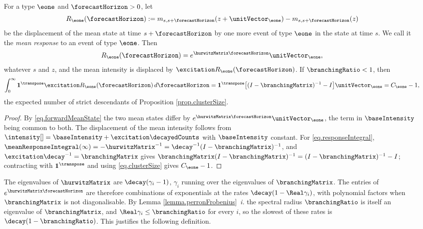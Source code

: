 \begin{corol}\label{corol.meanResponse}
 For a type $\eone$ and $\forecastHorizon > 0$, let
 \begin{equation*}
  R_{\eone}(\forecastHorizon)
  := m_{s,s+\forecastHorizon}(z + \unitVector_{\eone})
  - m_{s,s+\forecastHorizon}(z)
 \end{equation*}
 be the displacement of the mean state at time $s + \forecastHorizon$
 by one more event of type $\eone$ in the state at time $s$.
 We call it the \emph{mean response} to an event of type $\eone$.
 Then
 \begin{equation}\label{eq.meanResponse}
  R_{\eone}(\forecastHorizon) = e^{\hurwitzMatrix \forecastHorizon}\unitVector_{\eone} ,
 \end{equation}
 whatever $s$ and $z$,
 and the mean intensity is displaced by $\excitation R_{\eone}(\forecastHorizon)$.
 If $\branchingRatio < 1$, then
 \begin{equation}\label{eq.responseIntegral}
  \int_{0}^{\infty} \mathbf{1}^{\transpose}\excitation R_{\eone}(\forecastHorizon)
  \, d\forecastHorizon
  = \mathbf{1}^{\transpose}\big[ (I - \branchingMatrix)^{-1} - I \big] \unitVector_{\eone}
  = C_{\eone} - 1 ,
 \end{equation}
 the expected number of strict descendants of Proposition \ref{prop.clusterSize}.
\end{corol}
\begin{proof}
 By \eqref{eq.forwardMeanState} the two mean states differ by
 $e^{\hurwitzMatrix \forecastHorizon}\unitVector_{\eone}$,
 the term in $\baseIntensity$ being common to both.
 The displacement of the mean intensity follows from
 $\intensity[ ] = \baseIntensity + \excitation\decayedCounts$ with $\baseIntensity$
 constant.
 For \eqref{eq.responseIntegral}, $\meanResponseIntegral(\infty) = -\hurwitzMatrix^{-1}
 = \decay^{-1}(I-\branchingMatrix)^{-1}$,
 and $\excitation\decay^{-1} = \branchingMatrix$ gives
 $\branchingMatrix(I-\branchingMatrix)^{-1} = (I-\branchingMatrix)^{-1} - I$;
 contracting with $\mathbf{1}^{\transpose}$ and using \eqref{eq.clusterSize} gives
 $C_{\eone}-1$.
\end{proof}

The eigenvalues of $\hurwitzMatrix$ are $\decay(\gamma_i - 1)$,
$\gamma_i$ running over the eigenvalues of $\branchingMatrix$.
The entries of $e^{\hurwitzMatrix \forecastHorizon}$ are therefore combinations of
exponentials at the rates $\decay(1 - \Real\gamma_i)$,
with polynomial factors when $\branchingMatrix$ is not diagonalisable.
By Lemma \ref{lemma.perronFrobenius}~\emph{i.} the spectral radius $\branchingRatio$ is
itself an eigenvalue of $\branchingMatrix$,
and $\Real\gamma_i \leq \branchingRatio$ for every $i$,
so the slowest of these rates is $\decay(1-\branchingRatio)$.
This justifies the following definition.

